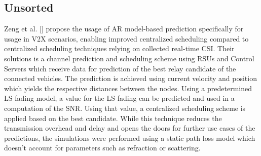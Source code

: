 \documentclass[conference]{IEEEtran}
\begin{document}
\subsection{Unsorted}


Zeng et al. [] propose the usage of AR model-based prediction specifically for usage in V2X scenarios, enabling improved centralized scheduling compared to centralized scheduling techniques relying on collected real-time CSI. 
Their solutions is a channel prediction and scheduling scheme using RSUs and Control Servers which receive data for prediction of the best relay candidate of the connected vehicles. The prediction is achieved using current velocity and position which yields the respective distances between the nodes. Using a predetermined LS fading model, a value for the LS fading can be predicted and used in a computation of the SNR. Using that value, a centralized scheduling scheme is applied based on the best candidate.
While this technique reduces the transmission overhead and delay and opens the doors for further use cases of the predictions, the simulations were performed using a static path loss model which doesn’t account for parameters such as refraction or scattering.


%
%

\end{document}

